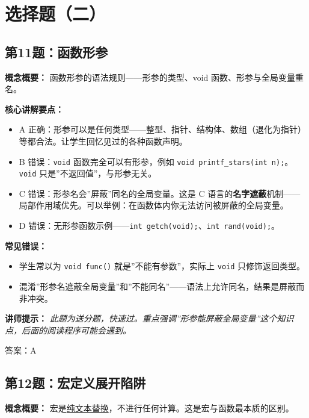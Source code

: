 \section{选择题（二）}

\subsection{第11题：函数形参}
\textbf{概念概要：} 函数形参的语法规则——形参的类型、void 函数、形参与全局变量重名。

\textbf{核心讲解要点：}
\begin{itemize}
    \item A 正确：形参可以是任何类型——整型、指针、结构体、数组（退化为指针）等都合法。让学生回忆见过的各种函数声明。
    \item B 错误：\texttt{void} 函数完全可以有形参，例如 \texttt{void printf\_stars(int n);}。\texttt{void} 只是”不返回值”，与形参无关。
    \item C 错误：形参名会”屏蔽”同名的全局变量。这是 C 语言的\textbf{名字遮蔽}机制——局部作用域优先。可以举例：在函数体内你无法访问被屏蔽的全局变量。
    \item D 错误：无形参函数示例——\texttt{int getch(void);}、\texttt{int rand(void);}。
\end{itemize}

\textbf{常见错误：}
\begin{itemize}
    \item 学生常以为 \texttt{void func()} 就是”不能有参数”，实际上 \texttt{void} 只修饰返回类型。
    \item 混淆”形参名遮蔽全局变量”和”不能同名”——语法上允许同名，结果是屏蔽而非冲突。
\end{itemize}

\textbf{讲师提示：} \textit{此题为送分题，快速过。重点强调”形参能屏蔽全局变量”这个知识点，后面的阅读程序可能会遇到。}

{\color{highlight}答案：A}

\subsection{第12题：宏定义展开陷阱}

\textbf{概念概要：} 宏是\underline{纯文本替换}，不进行任何计算。这是宏与函数最本质的区别。

